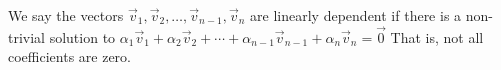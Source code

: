 We say the vectors
\(\vec{v}_{1}, \vec{v}_{2},  \dots ,\vec{v}_{n - 1},\vec{v}_{n}\) are
linearly dependent if there is a non-trivial solution to
\(\alpha_{1}\vec{v}_{1}  +  \alpha_{2}\vec{v}_{2}  +  \dotsb  +  \alpha_{n - 1}\vec{v}_{n - 1}  +  \alpha_{n}\vec{v}_{n} = \vec{0}\)
That is, not all coefficients are zero.
